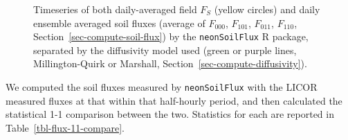 \documentclass[
  letterpaper,
  DIV=11,
  numbers=noendperiod]{scrartcl}
\begin{document}
\begin{figure}


\caption{\label{fig-flux-results-year}Timeseries of both daily-averaged
field \(F_{S}\) (yellow circles) and daily ensemble averaged soil fluxes
(average of \(F_{000}\), \(F_{101}\), \(F_{011}\), \(F_{110}\),
Section~\ref{sec-compute-soil-flux}) by the \texttt{neonSoilFlux} R
package, separated by the diffusivity model used (green or purple lines,
Millington-Quirk or Marshall, Section~\ref{sec-compute-diffusivity}).}

\end{figure}%

We computed the soil fluxes measured by \texttt{neonSoilFlux} with the
LICOR measured fluxes at that within that half-hourly period, and then
calculated the statistical 1-1 comparison between the two. Statistics
for each are reported in Table~\ref{tbl-flux-11-compare}.
\end{document}
